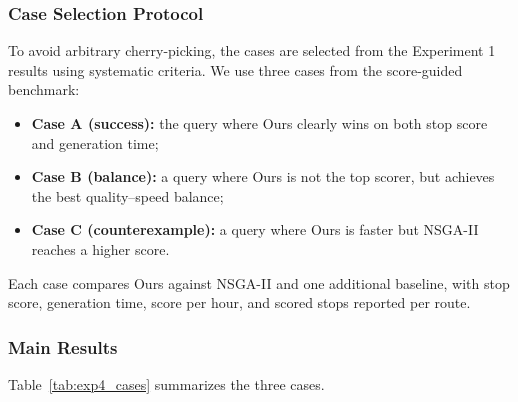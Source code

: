 \subsubsection{Case Selection Protocol}
To avoid arbitrary cherry-picking, the cases are selected from the Experiment 1 results
using systematic criteria.
We use three cases from the score-guided benchmark:
\begin{itemize}[leftmargin=1.5em]
    \item \textbf{Case A (success):} the query where Ours clearly wins on both stop score and generation time;
    \item \textbf{Case B (balance):} a query where Ours is not the top scorer, but achieves the best quality--speed balance;
    \item \textbf{Case C (counterexample):} a query where Ours is faster but NSGA-II reaches a higher score.
\end{itemize}
Each case compares Ours against NSGA-II and one additional baseline,
with stop score, generation time, score per hour, and scored stops reported per route.

\subsubsection{Main Results}
Table~\ref{tab:exp4_cases} summarizes the three cases.

\begin{table}[t]
    \centering
    \small
    \caption{Route case study: selected cases from Experiment 1.}
    \label{tab:exp4_cases}
\end{table}

